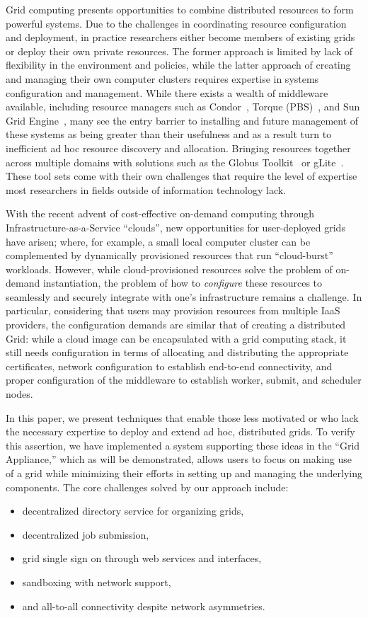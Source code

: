 \documentclass[conference]{IEEEtran}
\begin{document}
Grid computing presents opportunities to combine distributed resources to form
powerful systems.  Due to the challenges in coordinating resource configuration
and deployment, in practice researchers either become members of existing grids
or deploy their own private resources.  The former approach is limited by lack
of flexibility in the environment and policies, while the latter approach of
creating and managing their own computer clusters requires expertise in systems
configuration and management.  While there exists a wealth of middleware
available, including resource managers such as Condor~\cite{condor0}, Torque
(PBS)~\cite{torque}, and Sun Grid Engine~\cite{grid_engine}, many see the entry
barrier to installing and future management of these systems as being greater
than their usefulness and as a result turn to inefficient ad hoc resource
discovery and allocation.  Bringing resources together across multiple domains
with solutions such as the Globus Toolkit~\cite{globus} or gLite~\cite{glite}.
These tool sets come with their own challenges that require the level of
expertise most researchers in fields outside of information technology lack.

With the recent advent of cost-effective on-demand computing through
Infrastructure-as-a-Service ``clouds'', new opportunities for user-deployed
grids have arisen; where, for example, a small local computer cluster can be
complemented by dynamically provisioned resources that run ``cloud-burst''
workloads.  However, while cloud-provisioned resources solve the problem of
on-demand instantiation, the problem of how to {\em configure} these resources
to seamlessly and securely integrate with one's infrastructure remains a
challenge.  In particular, considering that users may provision resources from
multiple IaaS providers, the configuration demands are similar that of creating
a distributed Grid: while a cloud image can be encapsulated with a grid
computing stack, it still needs configuration in terms of allocating and
distributing the appropriate certificates, network configuration to establish
end-to-end connectivity, and proper configuration of the middleware to
establish worker, submit, and scheduler nodes.  

In this paper, we present techniques that enable those less motivated or who
lack the necessary expertise to deploy and extend ad hoc, distributed grids.
To verify this assertion, we have implemented a system supporting these ideas
in the ``Grid Appliance,'' which as will be demonstrated, allows users to focus
on making use of a grid while minimizing their efforts in setting up and
managing the underlying components.  The core challenges solved by our approach
include:
\begin{itemize}
\item decentralized directory service for organizing grids,
\item decentralized job submission,
\item grid single sign on through web services and interfaces,
\item sandboxing with network support,
\item and all-to-all connectivity despite network asymmetries.
\end{itemize}
\end{document}
